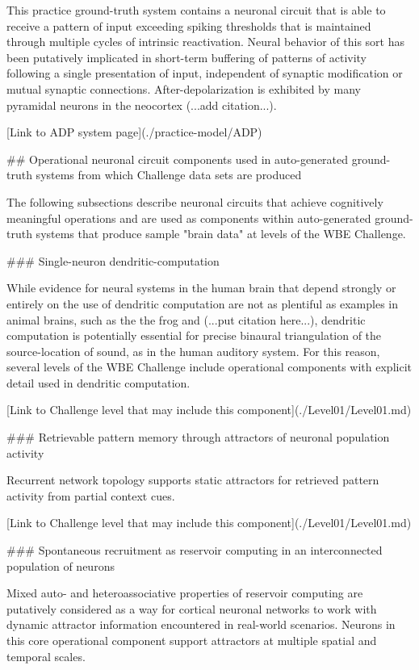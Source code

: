 \documentclass{ldr-article}
\begin{document}
This practice ground-truth system contains a neuronal circuit that is able to receive a pattern of input exceeding
spiking thresholds that is maintained through multiple cycles of intrinsic reactivation. Neural behavior of
this sort has been putatively implicated in short-term buffering of patterns of activity following a single
presentation of input, independent of synaptic modification or mutual synaptic connections. After-depolarization
is exhibited by many pyramidal neurons in the neocortex (...add citation...).

[Link to ADP system page](./practice-model/ADP)


## Operational neuronal circuit components used in auto-generated ground-truth systems from which Challenge data sets are produced

The following subsections describe neuronal circuits that achieve cognitively meaningful operations
and are used as components within auto-generated ground-truth systems that produce sample "brain data"
at levels of the WBE Challenge.

### Single-neuron dendritic-computation

While evidence for neural systems in the human brain that depend strongly or entirely on the use of
dendritic computation are not as plentiful as examples in animal brains, such as the the frog and
(...put citation here...), dendritic computation is potentially essential for precise binaural
triangulation of the source-location of sound, as in the human auditory system. For this reason,
several levels of the WBE Challenge include operational components with explicit detail used in
dendritic computation.

[Link to Challenge level that may include this component](./Level01/Level01.md)

### Retrievable pattern memory through attractors of neuronal population activity

Recurrent network topology supports static attractors for retrieved pattern activity from
partial context cues.

[Link to Challenge level that may include this component](./Level01/Level01.md)

### Spontaneous recruitment as reservoir computing in an interconnected population of neurons

Mixed auto- and heteroassociative properties of reservoir computing are putatively considered as
a way for cortical neuronal networks to work with dynamic attractor information encountered in
real-world scenarios. Neurons in this core operational component support attractors at multiple
spatial and temporal scales.
\end{document}
